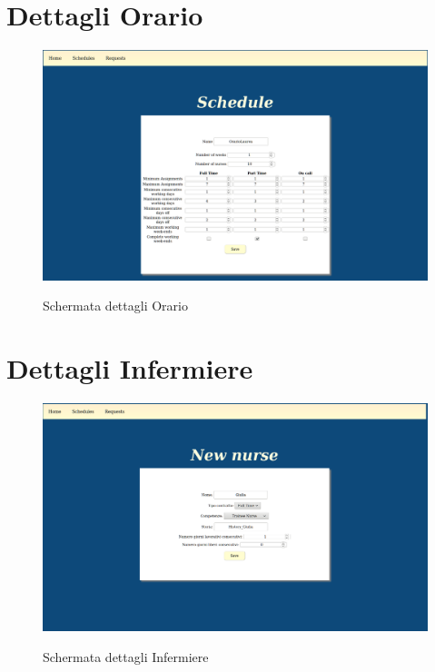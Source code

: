 \section{Dettagli Orario}
\begin{figure}[H]
\begin{center}
  \includegraphics[scale=0.20]{img/Schermate/S2.png}\\
  \caption{Schermata dettagli Orario}
\end{center}
\end{figure}

\section{Dettagli Infermiere}
\begin{figure}[H]
\begin{center}
  \includegraphics[scale=0.20]{img/Schermate/S5.png}\\
  \caption{Schermata dettagli Infermiere}
\end{center}
\end{figure}

